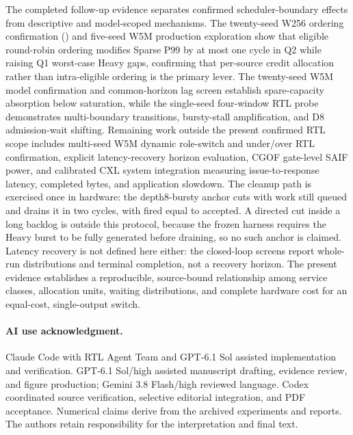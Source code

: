 The completed follow-up evidence separates confirmed scheduler-boundary effects from descriptive and model-scoped mechanisms. The twenty-seed W256 ordering confirmation () and five-seed W5M production exploration show that eligible round-robin ordering modifies Sparse P99 by at most one cycle in Q2 while raising Q1 worst-case Heavy gaps, confirming that per-source credit allocation rather than intra-eligible ordering is the primary lever. The twenty-seed W5M model confirmation and common-horizon lag screen establish spare-capacity absorption below saturation, while the single-seed four-window RTL probe demonstrates multi-boundary transitions, bursty-stall amplification, and D8 admission-wait shifting. Remaining work outside the present confirmed RTL scope includes multi-seed W5M dynamic role-switch and under/over RTL confirmation, explicit latency-recovery horizon evaluation, CGOF gate-level SAIF power, and calibrated CXL system integration measuring issue-to-response latency, completed bytes, and application slowdown. The cleanup path is exercised once in hardware: the depth8-bursty anchor cuts with work still queued and drains it in two cycles, with fired equal to accepted. A directed cut inside a long backlog is outside this protocol, because the frozen harness requires the Heavy burst to be fully generated before draining, so no such anchor is claimed. Latency recovery is not defined here either: the closed-loop screens report whole-run distributions and terminal completion, not a recovery horizon. The present evidence establishes a reproducible, source-bound relationship among service classes, allocation units, waiting distributions, and complete hardware cost for an equal-cost, single-output switch.

\paragraph{AI use acknowledgment.}
Claude Code with RTL Agent Team and GPT-6.1 Sol assisted implementation and verification. GPT-6.1 Sol/high assisted manuscript drafting, evidence review, and figure production; Gemini 3.8 Flash/high reviewed language. Codex coordinated source verification, selective editorial integration, and PDF acceptance. Numerical claims derive from the archived experiments and reports. The authors retain responsibility for the interpretation and final text.
